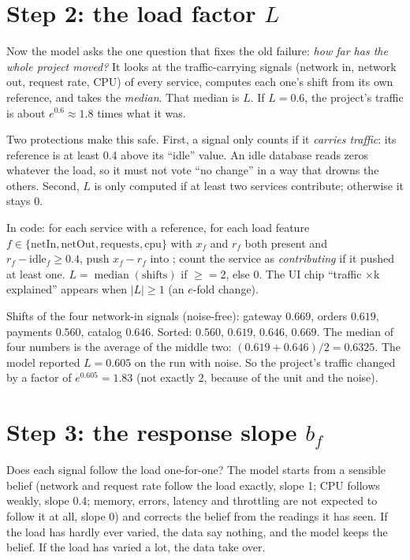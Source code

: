 \section{Step 2: the load factor $L$}
\begin{simplebox}
Now the model asks the one question that fixes the old failure: \emph{how far has the whole project moved?} It looks at the traffic-carrying signals (network in, network out, request rate, CPU) of every service, computes each one's shift from its own reference, and takes the \emph{median}. That median is $L$. If $L=0.6$, the project's traffic is about $e^{0.6}\approx1.8$ times what it was.

Two protections make this safe. First, a signal only counts if it \emph{carries traffic}: its reference is at least 0.4 above its ``idle'' value. An idle database reads zeros whatever the load, so it must not vote ``no change'' in a way that drowns the others. Second, $L$ is only computed if at least two services contribute; otherwise it stays 0.
\end{simplebox}

\begin{techbox}
In code: for each service with a reference, for each load feature $f\in\{\text{netIn},\text{netOut},\text{requests},\text{cpu}\}$ with $x_f$ and $r_f$ both present and $r_f-\text{idle}_f\ge0.4$, push $x_f-r_f$ into ; count the service as \emph{contributing} if it pushed at least one. $L=\operatorname{median}(\text{shifts})$ if $\ge$$=2$, else $0$. The UI chip ``traffic $\times$k explained'' appears when $|L|\ge1$ (an $e$-fold change).
\end{techbox}

\begin{examplebox}
Shifts of the four network-in signals (noise-free): gateway $0.669$, orders $0.619$, payments $0.560$, catalog $0.646$. Sorted: $0.560,\,0.619,\,0.646,\,0.669$. The median of four numbers is the average of the middle two: $(0.619+0.646)/2=0.6325$. The model reported $L=0.605$ on the run with noise. So the project's traffic changed by a factor of $e^{0.605}=1.83$ (not exactly 2, because of the unit and the noise).
\end{examplebox}

\section{Step 3: the response slope $b_f$}
\begin{simplebox}
Does each signal follow the load one-for-one? The model starts from a sensible belief (network and request rate follow the load exactly, slope 1; CPU follows weakly, slope 0.4; memory, errors, latency and throttling are not expected to follow it at all, slope 0) and corrects the belief from the readings it has seen. If the load has hardly ever varied, the data say nothing, and the model keeps the belief. If the load has varied a lot, the data take over.
\end{simplebox}

